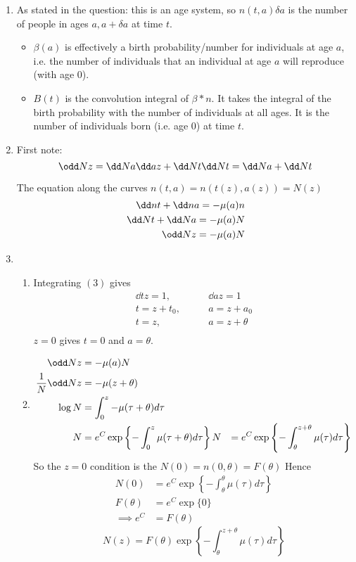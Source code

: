 \documentclass{X:/Documents/Coding/Latex/myassignment}
\begin{document}
\begin{enumerate}
	\begin{enumerate}
		\item As stated in the question: this is an age system, so $n(t,a) \delta a$ is the number of people in ages $a, a+ \delta a$ at time $t$.  
		\begin{itemize}
			\item $\beta(a)$ is effectively a birth probability/number for individuals at age $a$, i.e. the number of individuals that an individual at age $a$ will reproduce (with age $0$). 
			\item $B(t)$ is the convolution integral of $\beta * n$. It takes the integral of the birth probability with the number of individuals at all ages. It is the number of individuals born (i.e. age $0$) at time $t$.
		\end{itemize}
		\item First note:
		\[\odd Nz = \dd Na \dd az + \dd Nt \dd Nt = \dd Na + \dd Nt\]

		The equation along the curves $n(t,a) = n(t(z),a(z)) = N(z)$ 
		\begin{align*}
			\dd nt + \dd na = -\mu(a) n \\
			\dd Nt + \dd Na = - \mu(a) N \\
			\odd Nz= -\mu(a) N \\
		\end{align*}

		\item 
		\begin{enumerate}
			\item Integrating $(3)$ gives
			\begin{align*}
				\dd tz = 1,& \qquad \dd az =1\\
				t = z + t_0,&\qquad a = z + a_0\\
				t = z,& \qquad a = z + \theta\\
			\end{align*}
			$z=0$ gives $t=0$ and $a = \theta$.


			\item 
			\begin{align*}
				\odd Nz &= - \mu(a) N\\
				\frac1N \odd Nz &= - \mu(z+\theta)\\
				\log N &= \int_0^z -\mu(\tau+\theta) d \tau\\
				N &= e^{C} \exp\left\{-\int_0^z \mu(\tau+\theta) d \tau\right\}
				N &= e^{C} \exp\left\{-\int_\theta^{z+\theta} \mu(\tau) d \tau\right\}
			\end{align*}
			So the $z=0$ condition is the $N(0) = n(0,\theta) = F(\theta)$
			Hence
			\begin{align*}
				N(0) &= e^{C} \exp\left\{-\int_\theta^{\theta} \mu(\tau) d \tau\right\}\\
				F(\theta)&= e^C \exp\{0\}\\
				\implies e^C &= F(\theta)
			\end{align*}
			\[N(z) = F(\theta) \exp\left\{-\int_\theta^{z+\theta} \mu(\tau) d \tau\right\}\]


\end{enumerate}
\end{enumerate}
\end{enumerate}
\end{document}
